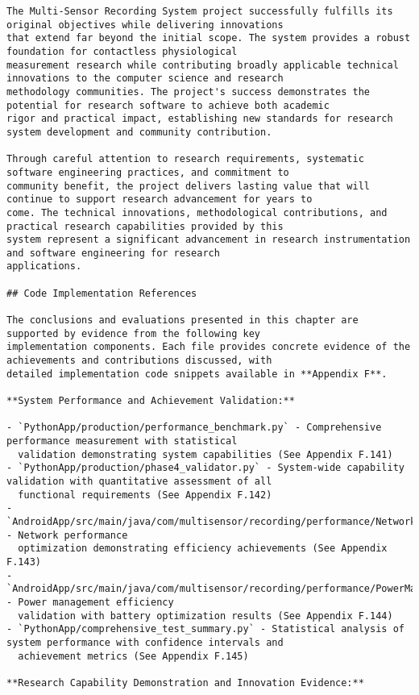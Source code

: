 \documentclass[11pt,a4paper]{report}
\begin{document}
\begin{verbatim}
The Multi-Sensor Recording System project successfully fulfills its original objectives while delivering innovations
that extend far beyond the initial scope. The system provides a robust foundation for contactless physiological
measurement research while contributing broadly applicable technical innovations to the computer science and research
methodology communities. The project's success demonstrates the potential for research software to achieve both academic
rigor and practical impact, establishing new standards for research system development and community contribution.

Through careful attention to research requirements, systematic software engineering practices, and commitment to
community benefit, the project delivers lasting value that will continue to support research advancement for years to
come. The technical innovations, methodological contributions, and practical research capabilities provided by this
system represent a significant advancement in research instrumentation and software engineering for research
applications.

## Code Implementation References

The conclusions and evaluations presented in this chapter are supported by evidence from the following key
implementation components. Each file provides concrete evidence of the achievements and contributions discussed, with
detailed implementation code snippets available in **Appendix F**.

**System Performance and Achievement Validation:**

- `PythonApp/production/performance_benchmark.py` - Comprehensive performance measurement with statistical
  validation demonstrating system capabilities (See Appendix F.141)
- `PythonApp/production/phase4_validator.py` - System-wide capability validation with quantitative assessment of all
  functional requirements (See Appendix F.142)
- `AndroidApp/src/main/java/com/multisensor/recording/performance/NetworkOptimizer.kt` - Network performance
  optimization demonstrating efficiency achievements (See Appendix F.143)
- `AndroidApp/src/main/java/com/multisensor/recording/performance/PowerManager.kt` - Power management efficiency
  validation with battery optimization results (See Appendix F.144)
- `PythonApp/comprehensive_test_summary.py` - Statistical analysis of system performance with confidence intervals and
  achievement metrics (See Appendix F.145)

**Research Capability Demonstration and Innovation Evidence:**


\end{verbatim}
\end{document}
